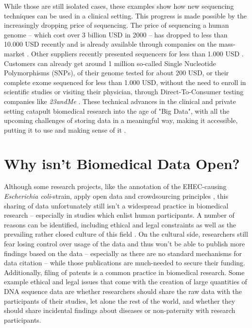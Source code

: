 \documentclass[runningheads,a4paper]{llncs}
\begin{document}
While those are still isolated cases, these examples show how new sequencing techniques can be used in a clinical setting. This progress is made possible by the increasingly dropping price of sequencing. The price of sequencing a human genome – which cost over 3 billion USD in 2000 – has dropped to less than 10.000 USD recently and is already available through companies on the mass-market \cite{everygenome}. Other suppliers recently presented sequencers for less than 1.000 USD \cite{nanopore}. 
Customers can already get around 1 million so-called Single Nucleotide Polymorphisms (SNPs), of their genome tested for about 200 USD, or their complete exome sequenced for less than 1.000 USD, without the need to enroll in scientific studies or visiting their physician, through Direct-To-Consumer testing companies like \emph{23andMe} \cite{23andme}. These technical advances in the clinical and private setting catapult biomedical research into the age of "Big Data", with all the upcoming challenges of storing data in a meaningful way, making it accessible, putting it to use and making sense of it \cite{howe}.

\section{Why isn't Biomedical Data Open?}
Although some research projects, like the annotation of the EHEC-causing \emph{Escherichia coli}-strain, apply open data and crowdsourcing principles \cite{ecoli}, this sharing of data unfortunately still isn't a widespread practice in biomedical research – especially in studies which enlist human participants. A number of reasons can be identified, including ethical and legal constraints as well as the prevailing rather closed culture of this field \cite{nelson}. On the cultural side, researchers still fear losing control over usage of the data and thus won't be able to publish more findings based on the data – especially as there are no standard mechanisms for data citation – while those publications are much-needed to secure their funding. Additionally, filing of patents is a common practice in biomedical research. 
Some example ethical and legal issues that come with the creation of large quantities of DNA sequence data are whether researchers should share the raw data with the participants of their studies, let alone the rest of the world, and whether they should share incidental findings about diseases or non-paternity with research participants. 
\end{document}
